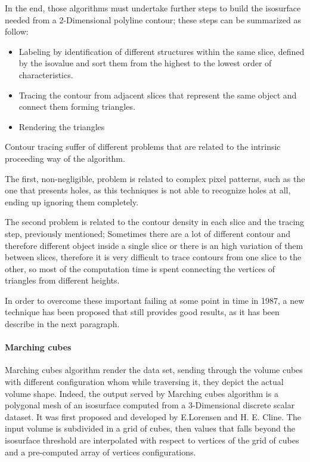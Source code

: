 \documentclass[12pt,a4paper]{extarticle}
\newcommand{\linespace}{\vspace{8pt}}
\begin{document}
In the end, those algorithms must undertake further steps to build the isosurface needed from a 2-Dimensional polyline contour; these steps can be summarized as follow:
\begin{itemize}
\item Labeling by identification of different structures within the same slice, defined by the isovalue and sort them from the highest to the lowest order of characteristics.
\item Tracing the contour from adjacent slices that represent the same object and connect them forming triangles.
\item Rendering the triangles
\end{itemize}


Contour tracing suffer of different problems that are related to the intrinsic  proceeding way of the algorithm.

The first, non-negligible, problem is related to complex pixel patterns, such as the one that presents holes, as this techniques is not able to recognize holes at all, ending up ignoring them completely.

The second problem is related to the contour density in each slice and the tracing step, previously mentioned; Sometimes there are a lot of different contour and therefore different object inside a single slice or there is an high variation of them between slices, therefore it is very difficult to trace contours from one slice to the other, so most of the computation time is spent connecting the vertices of triangles from different heights.
\linespace

In order to overcome these important failing at some point in time in 1987, a new technique has been proposed that still provides good results, as it has been describe in the next paragraph.
  

\paragraph{Marching cubes}
Marching cubes algorithm render the data set, sending through the volume cubes with different configuration whom while traversing it, they depict the actual volume shape. Indeed, the output served by Marching cubes algorithm is a polygonal mesh of an isosurface computed from a 3-Dimensional discrete scalar dataset. It was first proposed and developed by E.Lorensen and H. E. Cline. The input volume is subdivided in a grid of cubes, then values that falls beyond the isosurface threshold are interpolated with respect to vertices of the grid of cubes and a pre-computed array of vertices configurations.
\end{document}
